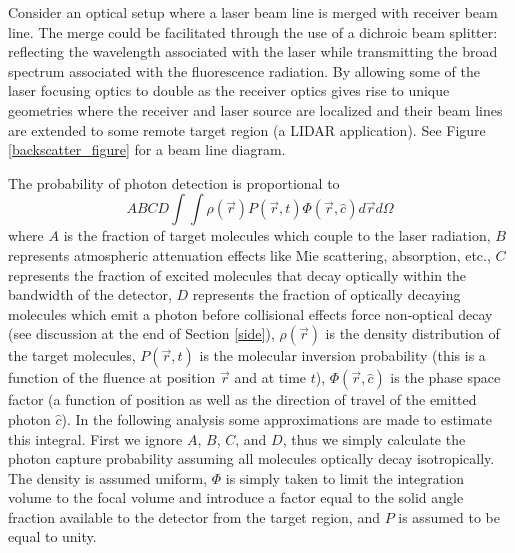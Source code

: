 \label{backscatter section}
Consider an optical setup where a laser beam line is merged with receiver beam line. The merge could be facilitated through the use of a dichroic beam splitter: reflecting the wavelength associated with the laser while transmitting the broad spectrum associated with the fluorescence radiation. By allowing some of the laser focusing optics to double as the receiver optics gives rise to unique geometries where the receiver and laser source are localized and their beam lines are extended to some remote target region (a LIDAR application). See Figure \ref{backscatter_figure} for a beam line diagram.


The probability of photon detection is proportional to
\begin{equation}
ABCD
\int\int
\rho(\vec{r})
P(\vec{r},t)
\Phi(\vec{r},\hat{c})
d\vec{r}
d\Omega
\label{total_prob}
\end{equation}
where $A$ is the fraction of target molecules which couple to the laser radiation, $B$ represents atmospheric attenuation effects like Mie scattering, absorption, etc., $C$ represents the fraction of excited molecules that decay optically within the bandwidth of the detector, $D$ represents the fraction of optically decaying molecules which emit a photon before collisional effects force non-optical decay (see discussion at the end of Section \ref{side}), $\rho(\vec{r})$ is the density distribution of the target molecules, $P(\vec{r},t)$ is the molecular inversion probability (this is a function of the fluence at position $\vec{r}$ and at time $t$), $\Phi(\vec{r},\hat{c})$ is the phase space factor (a function of position as well as the direction of travel of the emitted photon $\hat{c}$). In the following analysis some approximations are made to estimate this integral. First we ignore $A$, $B$, $C$, and $D$, thus we simply calculate the photon capture probability assuming all molecules optically decay isotropically. The density is assumed uniform, $\Phi$ is simply taken to limit the integration volume to the focal volume and introduce a factor equal to the solid angle fraction available to the detector from the target region, and $P$ is assumed to be equal to unity.


